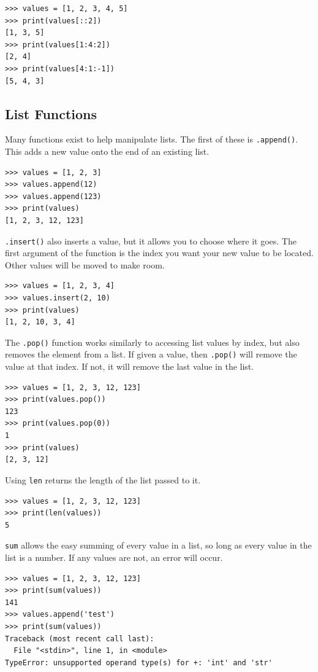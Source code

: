 \documentclass[11pt]{cselabheader}
\begin{document}
\begin{lstlisting}[style=ipython]
>>> values = [1, 2, 3, 4, 5]
>>> print(values[::2])
[1, 3, 5]
>>> print(values[1:4:2])
[2, 4]
>>> print(values[4:1:-1])
[5, 4, 3]
\end{lstlisting}

\subsection{List Functions}
Many functions exist to help manipulate lists. The first of these is
\lstinline{.append()}. This adds a new value onto the end of an existing list.

\begin{lstlisting}[style=ipython]
>>> values = [1, 2, 3]
>>> values.append(12)
>>> values.append(123)
>>> print(values)
[1, 2, 3, 12, 123]
\end{lstlisting}

\lstinline{.insert()} also inserts a value, but it allows you to choose where it
goes. The first argument of the function is the index you want your new value to
be located. Other values will be moved to make room.

\begin{lstlisting}[style=ipython]
>>> values = [1, 2, 3, 4]
>>> values.insert(2, 10)
>>> print(values)
[1, 2, 10, 3, 4]
\end{lstlisting}

The \lstinline{.pop()} function works similarly to accessing list values by
index, but also removes the element from a list. If given a value, then
\lstinline{.pop()} will remove the value at that index. If not, it will remove
the last value in the list.

\begin{lstlisting}[style=ipython]
>>> values = [1, 2, 3, 12, 123]
>>> print(values.pop())
123
>>> print(values.pop(0))
1
>>> print(values)
[2, 3, 12]
\end{lstlisting}


Using \lstinline{len} returns the length of the list passed to it.

\begin{lstlisting}[style=ipython]
>>> values = [1, 2, 3, 12, 123]
>>> print(len(values))
5
\end{lstlisting}

\lstinline{sum} allows the easy summing of every value in a list, so long as
every value in the list is a number. If any values are not, an error will occur.

\begin{lstlisting}[style=ipython]
>>> values = [1, 2, 3, 12, 123]
>>> print(sum(values))
141
>>> values.append('test')
>>> print(sum(values))
Traceback (most recent call last):
  File "<stdin>", line 1, in <module>
TypeError: unsupported operand type(s) for +: 'int' and 'str'
\end{lstlisting}
\end{document}
